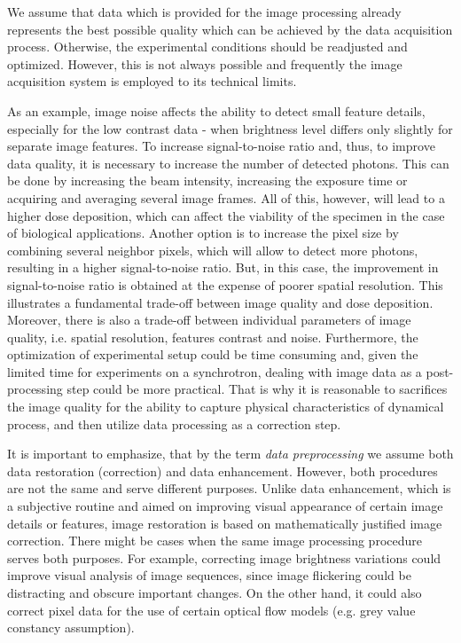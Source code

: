 We assume that data which is provided for the image processing already represents the best possible quality which can be achieved by the data acquisition process. Otherwise, the experimental conditions should be readjusted and optimized. However, this is not always possible and frequently the image acquisition system is employed to its technical limits. 

As an example, image noise affects the ability to detect small feature details, especially for the low contrast data - when brightness level differs only slightly for separate image features. To increase signal-to-noise ratio and, thus, to improve data quality, it is necessary to increase the number of detected photons. This can be done by increasing the beam intensity, increasing the exposure time or acquiring and averaging several image frames. All of this, however, will lead to a higher dose deposition, which can affect the viability of the specimen in the case of biological applications. Another option is to increase the pixel size by combining several neighbor pixels, which will allow to detect more photons, resulting in a higher signal-to-noise ratio. But, in this case, the improvement in signal-to-noise ratio is obtained at the expense of poorer spatial resolution. This illustrates a fundamental trade-off between image quality and dose deposition. Moreover, there is also a trade-off between individual parameters of image quality, i.e. spatial resolution, features contrast and noise. Furthermore, the optimization of experimental setup could be time consuming and, given the limited time for experiments on a synchrotron, dealing with image data as a post-processing step could be more practical. That is why it is reasonable to sacrifices the image quality for the ability to capture physical characteristics of dynamical process, and then utilize data processing as a correction step. 

It is important to emphasize, that by the term \textit{data preprocessing} we assume both data restoration (correction) and data enhancement. However, both procedures are not the same and serve different purposes. Unlike data enhancement, which is a subjective routine and aimed on improving visual appearance of certain image details or features, image restoration is based on mathematically justified image correction. There might be cases when the same image processing procedure serves both purposes. For example, correcting image brightness variations could improve visual analysis of image sequences, since image flickering could be distracting and obscure important changes. On the other hand, it could also correct pixel data for the use of certain optical flow models (e.g. grey value constancy assumption).



